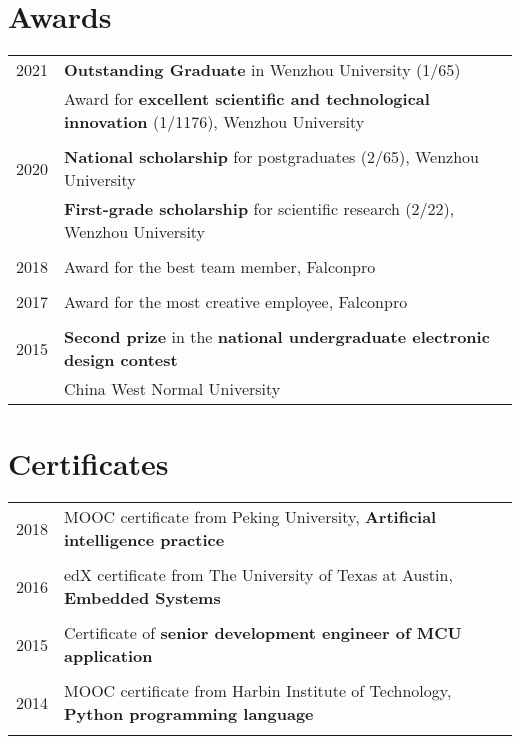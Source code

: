\documentclass[a4paper,10pt]{article} %
\begin{document}
\section{Awards}
\begin{tabular}{r|l}	
2021                        & \textbf{Outstanding Graduate} in Wenzhou University (1/65)\\
         				    & Award for \textbf{excellent scientific and technological innovation} (1/1176), Wenzhou University\\
\multicolumn{2}{c}{} \\	%

2020                        & \textbf{National scholarship} for postgraduates (2/65), Wenzhou University \\   	
                            & \textbf{First-grade scholarship} for scientific research (2/22), Wenzhou University \\
\multicolumn{2}{c}{} \\	%

2018                     & Award for the best team member, Falconpro\\
\multicolumn{2}{c}{} \\	%

2017                     & Award for the most creative employee, Falconpro \\
\multicolumn{2}{c}{} \\	%

2015                     & \textbf{Second prize} in the \textbf{national undergraduate electronic design contest} \\      & China West Normal University\\
\end{tabular}
	

\section{Certificates}
\begin{tabular}{r|l}	
2018                        & MOOC certificate from Peking University, \textbf{Artificial intelligence practice}\\
\multicolumn{2}{c}{} \\	%

2016                        & edX certificate from The University of Texas at Austin, \textbf{Embedded Systems} \\   	
\multicolumn{2}{c}{} \\	%

2015                     & Certificate of \textbf{senior development engineer of MCU application}\\
\multicolumn{2}{c}{} \\	%

2014                     & MOOC certificate from Harbin Institute of Technology, \textbf{Python programming language} \\
\multicolumn{2}{c}{} \\	%
\end{tabular}
\end{document}
